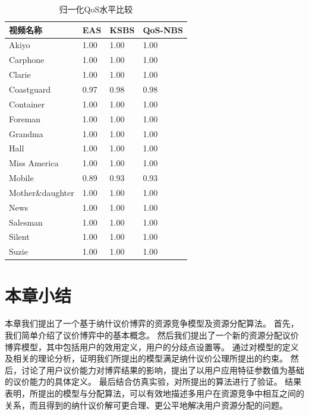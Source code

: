 \begin{table}[htbp]
    \wuhao
    \centering
    \caption{归一化QoS水平比较}
    \begin{tabular*}{\textwidth}{ p{} p{} p{} p{} }
        \toprule
     视频名称&   EAS& KSBS & QoS-NBS \\
     \midrule
Akiyo           	 & 1.00 & 1.00  &1.00\\ 
Carphone        	 & 1.00 & 1.00  &1.00\\ 
Clarie          	 & 1.00 & 1.00  &1.00\\ 
Coastguard      	 & 0.97 & 0.98  &0.98\\ 
Container       	 & 1.00 & 1.00  &1.00\\ 
Foreman         	 & 1.00 & 1.00  &1.00\\ 
Grandma         	 & 1.00 & 1.00  &1.00\\ 
Hall            	 & 1.00 & 1.00  &1.00\\ 
Miss America    	 & 1.00 & 1.00  &1.00\\ 
Mobile          	 & 0.89 & 0.93  &0.93\\ 
Mother\&daughter	 & 1.00 & 1.00  &1.00\\ 
News            	 & 1.00 & 1.00  &1.00\\ 
Salesman        	 & 1.00 & 1.00  &1.00\\ 
Silent          	 & 1.00 & 1.00  &1.00\\ 
Suzie           	 & 1.00 & 1.00  &1.00\\ 
\bottomrule
    \end{tabular*}
    \label{tab:chap_nash:qos_3_schemes}
\end{table}

\section{本章小结}
本章我们提出了一个基于纳什议价博弈的资源竞争模型及资源分配算法。
首先，我们简单介绍了议价博弈中的基本概念。
然后我们提出了一个新的资源分配议价博弈模型，其中包括用户的效用定义，用户的分歧点设置等。
通过对模型的定义及相关的理论分析，证明我们所提出的模型满足纳什议价公理所提出的约束。
然后，讨论了用户议价能力对博弈结果的影响，提出了以用户应用特征参数值为基础的议价能力的具体定义。
最后结合仿真实验，对所提出的算法进行了验证。
结果表明，所提出的模型与分配算法，可以有效地描述多用户在资源竞争中相互之间的关系，而且得到的纳什议价解可更合理、更公平地解决用户资源分配的问题。


